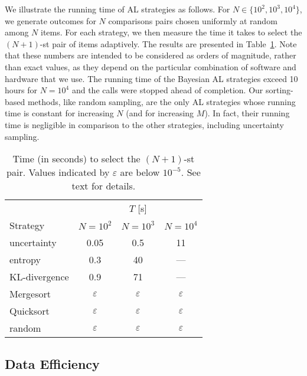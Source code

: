 We illustrate the running time of AL strategies as follows.
For $N \in \{10^2, 10^3, 10^4 \}$, we generate outcomes for $N$ comparisons pairs chosen uniformly at random among $N$ items.
For each strategy, we then measure the time it takes to select the $(N\!+\!1)$-st pair of items adaptively.
The results are presented in Table~\ref{rs:tab:runningtime}.
Note that these numbers are intended to be considered as orders of magnitude, rather than exact values, as they depend on the particular combination of software and hardware that we use.
The running time of the Bayesian AL strategies exceed \num{10} hours for $N = 10^4$ and the calls were stopped ahead of completion.
Our sorting-based methods, like random sampling, are the only AL strategies whose running time is constant for increasing $N$ (and for increasing $M$).
In fact, their running time is negligible in comparison to the other strategies, including uncertainty sampling.

\begin{table}[t]
  \caption{
Time (in seconds) to select the $(N\!+\!1)$-st pair.
Values indicated by $\varepsilon$ are below $10^{-5}$.
See text for details.
}
  \vspace{2mm}
  \label{rs:tab:runningtime}
  \centering
  \begin{tabular}{l ccc}
    \toprule
                  & \multicolumn{3}{c}{$T$ [s]} \\
                    \cmidrule(l){2-4}
    Strategy      & $N = 10^2$      & $N = 10^3$       & $N = 10^4$ \\
    \midrule
    uncertainty   & \num{0.05}      & \num{0.5}        & \num{11}      \\
    entropy       & \num{0.3}       & \num{40}         & ---           \\
    KL-divergence & \num{0.9}       & \num{71}         & ---           \\
    Mergesort     & $\varepsilon$   & $\varepsilon$    & $\varepsilon$ \\
    Quicksort     & $\varepsilon$   & $\varepsilon$    & $\varepsilon$ \\
    random        & $\varepsilon$   & $\varepsilon$    & $\varepsilon$ \\
    \bottomrule
  \end{tabular}
\end{table}


\subsection{Data Efficiency}

